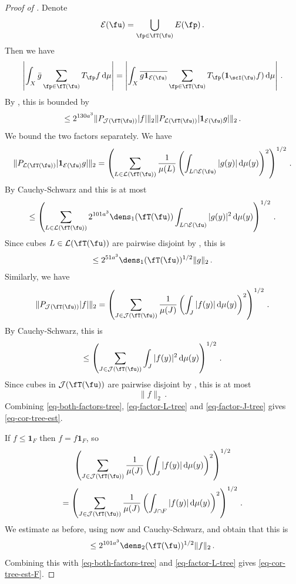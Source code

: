 \begin{proof}[Proof of ]
    Denote
    $$
        \mathcal{E}(\fu) = \bigcup_{\fp \in \fT(\fu)} E(\fp)\,.
    $$
    Then we have
    $$
        \left| \int_X \bar g \sum_{\fp \in \fT(\fu)} T_{\fp} f \, \mathrm{d}\mu \right| = \left| \int_X \overline{ g\mathbf{1}_{\mathcal{E}(\fu)}} \sum_{\fp \in \fT(\fu)} T_{\fp} (\mathbf{1}_{\scI(\fu)}f) \, \mathrm{d}\mu \right|\,.
    $$
    By , this is bounded by
    \begin{equation}
        \label{eq-both-factors-tree}
        \le 2^{130a^3}\|P_{\mathcal{J}(\fT(\fu))}|f|\|_2 \|P_{\mathcal{L}(\fT(\fu))} |\mathbf{1}_{\mathcal{E}(\fu)}g|\|_2\,.
    \end{equation}
    We bound the two factors separately.
    We have
    $$
        \|P_{\mathcal{L}(\fT(\fu))} |\mathbf{1}_{\mathcal{E}(\fu)}g|\|_2 = \left( \sum_{L \in \mathcal{L}(\fT(\fu))} \frac{1}{\mu(L)} \left(\int_{L \cap \mathcal{E}(\fu)} |g(y)| \, \mathrm{d}\mu(y)\right)^2 \right)^{1/2}\,.
    $$
    By Cauchy-Schwarz and  this is at most
    $$
        \le \left( \sum_{L \in \mathcal{L}(\fT(\fu))} 2^{101a^3} \dens_1(\fT(\fu)) \int_{L \cap \mathcal{E}(\fu)} |g(y)|^2 \, \mathrm{d}\mu(y) \right)^{1/2}\,.
    $$
    Since cubes $L \in \mathcal{L}(\fT(\fu))$ are pairwise disjoint by , this is
    \begin{equation}
        \label{eq-factor-L-tree}
         \le 2^{51 a^3} \dens_1(\fT(\fu))^{1/2} \|g\|_2\,.
    \end{equation}
    Similarly, we have
    \begin{equation}
        \label{eq-cor-tree-proof}
        \|P_{\mathcal{J}(\fT(\fu))}|f|\|_2 = \left( \sum_{J \in \mathcal{J}(\fT(\fu))} \frac{1}{\mu(J)} \left(\int_J |f(y)| \, \mathrm{d}\mu(y)\right)^2 \right)^{1/2}\,.
    \end{equation}
    By Cauchy-Schwarz, this is
    $$
        \le \left( \sum_{J \in \mathcal{J}(\fT(\fu))} \int_J |f(y)|^2 \, \mathrm{d}\mu(y) \right)^{1/2}\,.
    $$
    Since cubes in $\mathcal{J}(\fT(\fu))$ are pairwise disjoint by , this is at most
    \begin{equation}
        \label{eq-factor-J-tree}
        \|f\|_2\,.
    \end{equation}
    Combining \eqref{eq-both-factors-tree}, \eqref{eq-factor-L-tree} and \eqref{eq-factor-J-tree} gives \eqref{eq-cor-tree-est}.

    If $f \le \mathbf{1}_F$ then $f = f\mathbf{1}_F$, so
    $$
        \left( \sum_{J \in \mathcal{J}(\fT(\fu))} \frac{1}{\mu(J)} \left(\int_J |f(y)| \, \mathrm{d}\mu(y)\right)^2 \right)^{1/2}
    $$
    $$
        =\left(\sum_{J \in \mathcal{J}(\fT(\fu))} \frac{1}{\mu(J)} \left(\int_{J \cap F} |f(y)| \, \mathrm{d}\mu(y)\right)^2 \right)^{1/2}\,.
    $$
    We estimate as before, using now  and Cauchy-Schwarz, and obtain that this is
    $$
        \le 2^{101a^3} \dens_2(\fT(\fu))^{1/2} \|f\|_2\,.
    $$
    Combining this with \eqref{eq-both-factors-tree} and \eqref{eq-factor-L-tree} gives \eqref{eq-cor-tree-est-F}.
\end{proof}

